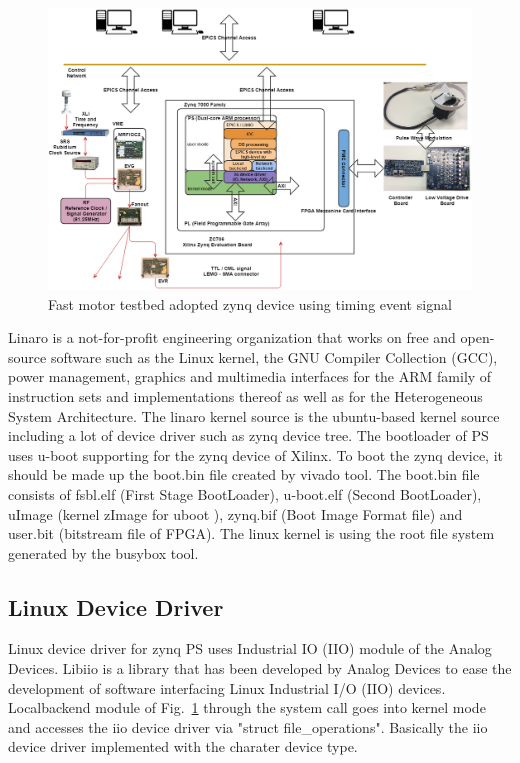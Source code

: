 \documentclass[a4paper,
              ]{jacow}
\begin{document}
\begin{figure}[!tbh]
	\centering
	\includegraphics*[width=\textwidth,height=0.7\textwidth]{motor-testbed}
	\caption{Fast motor testbed adopted zynq device using timing event signal}
	\label{stepper}
\end{figure}

Linaro is a not-for-profit engineering organization that works on free and open-source software such as the Linux kernel, the GNU Compiler Collection (GCC), power management, graphics and multimedia interfaces for the ARM family of instruction sets and implementations thereof as well as for the Heterogeneous System Architecture\cite{linaro}.   
The linaro kernel source is the ubuntu-based kernel source including a lot of device driver such as zynq device tree.
The bootloader of PS uses u-boot\cite{u-boot} supporting for the zynq device of Xilinx. To boot the zynq device, it should be made up the boot.bin file created by vivado\cite{vivado} tool. The boot.bin\cite{boot-bin} file consists of fsbl.elf (First Stage BootLoader), u-boot.elf (Second BootLoader), uImage (kernel zImage for uboot ), zynq.bif (Boot Image Format file) and user.bit (bitstream file of FPGA). The linux kernel is using the root file system generated by the busybox\cite{busybox} tool.

\subsection{Linux Device Driver}
Linux device driver for zynq PS uses Industrial IO (IIO) module of the Analog Devices. Libiio\cite{iio} is a library that has been developed by Analog Devices to ease the development of software interfacing Linux Industrial I/O (IIO) devices. Localbackend module of Fig.~\ref{stepper} through the system call goes into kernel mode and accesses the iio device driver via "struct file\_operations". Basically the iio device driver implemented with the charater device type.
\end{document}
